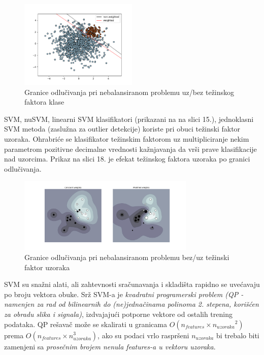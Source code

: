 \documentclass[fontsize=12bp, paper=a4]{scrarticle}
\begin{document}
\begin{figure}[h!]
    \centering
    \includegraphics[width=0.5\textwidth]{image-15.png}
    \caption{Granice odlučivanja pri nebalansiranom problemu uz/bez težinskog faktora klase}
\end{figure}

SVM, nuSVM, linearni SVM klasifikatori (prikazani na na slici 15.), jednoklasni SVM metoda (zaslužna za outlier detekcije) koriste pri obuci težinski faktor uzoraka. Ohrabriće se klasifikator težinskim faktorom uz multipliciranje nekim parametrom pozitivne decimalne vrednosti kažnjavanja  da vrši prave klasifikacije nad uzorcima. Prikaz na slici 18. je efekat težinskog faktora uzoraka po granici odlučivanja.

\begin{figure}[h!]
    \centering
    \includegraphics[width=0.75\textwidth]{image-16.png}
    \caption{Granice odlučivanja pri nebalansiranom problemu bez/uz težinski faktor uzoraka}
\end{figure}

SVM su snažni alati, ali zahtevnosti sračunavanja i skladišta rapidno se uvećavaju po broju vektora obuke. Srž SVM-a je \textit{kvadratni programerski problem (QP - namenjen za rad od bilinearnih do (ne)jednačinama polinoma 2. stepena, korišćen za obradu slika i signala)}\cite{qp}, izdvajajući potporne vektore od ostalih trening podataka. QP rešavač može se skalirati u granicama $O(n_{features} \times {n_{uzoraka}}^2)$ prema $O(n_{features} \times n_{uzoraka}^3)$, ako su podaci vrlo raspršeni $n_{uzoraka}$ bi trebalo biti zamenjeni sa \textit{prosečnim brojem nenula features-a u vektoru uzoraka}.
\end{document}
